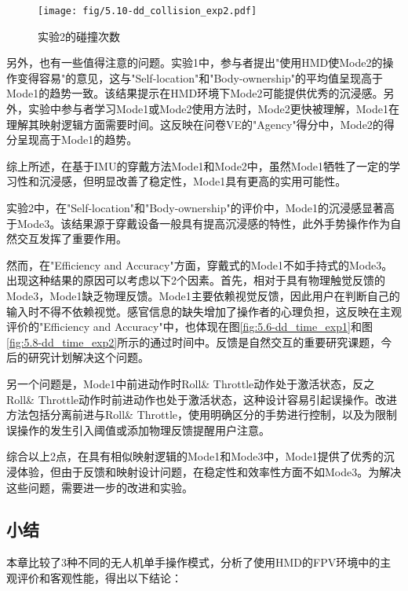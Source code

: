 \begin{figure}[htb]
    \texttt{[image: fig/5.10-dd\_collision\_exp2.pdf]}
    \centering
    \caption{实验2的碰撞次数}
    \label{fig:5.10-dd_collision_exp2}
\end{figure}



另外，也有一些值得注意的问题。实验1中，参与者提出"使用HMD使Mode2的操作变得容易"的意见，这与"Self-location"和"Body-ownership"的平均值呈现高于Mode1的趋势一致。该结果提示在HMD环境下Mode2可能提供优秀的沉浸感。另外，实验中参与者学习Mode1或Mode2使用方法时，Mode2更快被理解，Mode1在理解其映射逻辑方面需要时间。这反映在问卷VE的"Agency"得分中，Mode2的得分呈现高于Mode1的趋势。

综上所述，在基于IMU的穿戴方法Mode1和Mode2中，虽然Mode1牺牲了一定的学习性和沉浸感，但明显改善了稳定性，Mode1具有更高的实用可能性。

实验2中，在"Self-location"和"Body-ownership"的评价中，Mode1的沉浸感显著高于Mode3。该结果源于穿戴设备一般具有提高沉浸感的特性，此外手势操作作为自然交互发挥了重要作用。

然而，在"Efficiency and Accuracy"方面，穿戴式的Mode1不如手持式的Mode3。出现这种结果的原因可以考虑以下2个因素。首先，相对于具有物理触觉反馈的Mode3，Mode1缺乏物理反馈。Mode1主要依赖视觉反馈，因此用户在判断自己的输入时不得不依赖视觉。感官信息的缺失增加了操作者的心理负担，这反映在主观评价的"Efficiency and Accuracy"中，也体现在图\ref{fig:5.6-dd_time_exp1}和图\ref{fig:5.8-dd_time_exp2}所示的通过时间中。反馈是自然交互的重要研究课题，今后的研究计划解决这个问题。

另一个问题是，Mode1中前进动作时Roll\& Throttle动作处于激活状态，反之Roll\& Throttle动作时前进动作也处于激活状态，这种设计容易引起误操作。改进方法包括分离前进与Roll\& Throttle，使用明确区分的手势进行控制，以及为限制误操作的发生引入阈值或添加物理反馈提醒用户注意。

综合以上2点，在具有相似映射逻辑的Mode1和Mode3中，Mode1提供了优秀的沉浸体验，但由于反馈和映射设计问题，在稳定性和效率性方面不如Mode3。为解决这些问题，需要进一步的改进和实验。

\subsection{小结}

本章比较了3种不同的无人机单手操作模式，分析了使用HMD的FPV环境中的主观评价和客观性能，得出以下结论：

